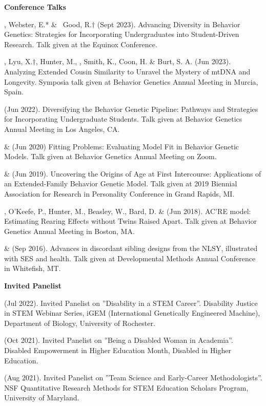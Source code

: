 {\large {\bf Conference Talks}}\begin{etaremune}

\item \meb, Webster, E.* \& \ Good, R.$\dagger$ (Sept 2023). Advancing Diversity in Behavior Genetics: Strategies for Incorporating Undergraduates into Student-Driven Research. Talk given at the Equinox Conference.

\item \meb, Lyu, X.$\dagger$, Hunter, M.,  \Joe, Smith, K., Coon, H. \& Burt, S. A. (Jun 2023). Analyzing Extended Cousin Similarity to Unravel the Mystery of mtDNA and Longevity. Symposia talk given at Behavior Genetics Annual Meeting in Murcia, Spain.

\item \meb (Jun 2022). Diversifying the Behavior Genetic Pipeline: Pathways and Strategies for Incorporating Undergraduate Students. Talk given at Behavior Genetics Annual Meeting in Los Angeles, CA.

\item \meb \& \Joe (Jun 2020) Fitting Problems: Evaluating Model Fit in Behavior Genetic Models. Talk given at Behavior Genetics Annual Meeting on Zoom.
%
\item \meb \& \Joe (Jun 2019). Uncovering the Origins of Age at First Intercourse: Applications of an Extended-Family Behavior Genetic Model. Talk given at 2019 Biennial Association for Research in Personality Conference in Grand Rapids, MI.
%
\item\meb, O'Keefe, P., Hunter, M., Beasley, W., Bard, D. \& \Joe (Jun 2018). AC'RE model: Estimating Rearing Effects without Twins Raised Apart. Talk given at Behavior Genetics Annual Meeting in Boston, MA.
%
\item\meb \& \joe (Sep 2016). Advances in discordant sibling designs from the NLSY, illustrated with SES and health. Talk given at Developmental Methods Annual Conference in Whitefish, MT.%
%
\end{etaremune}
{\large \bf Invited Panelist}
\begin{etaremune}

\item \meb (Jul 2022). Invited Panelist on ''Disability in a STEM Career''. Disability Justice in STEM Webinar Series, iGEM (International Genetically Engineered Machine), Department of Biology, University of Rochester.
%
\item \meb (Oct 2021). Invited Panelist on ''Being a Disabled Woman in Academia''. Disabled Empowerment in Higher Education Month, Disabled in Higher Education.
%
\item \meb (Aug 2021). Invited Panelist on ''Team Science and Early-Career Methodologists''. NSF Quantitative Research Methods for STEM Education Scholars Program, University of Maryland.%
\end{etaremune}
